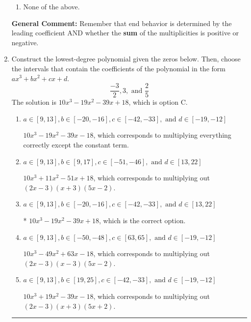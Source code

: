 \documentclass{extbook}[14pt]
\newcommand{\litem}[1]{\item #1

\rule{\textwidth}{0.4pt}}
\begin{document}
\begin{enumerate}
{\begin{enumerate}[label=\Alph*.]
\begin{multicols}{2}
\end{multicols}\item None of the above.\end{enumerate}
\textbf{General Comment:} Remember that end behavior is determined by the leading coefficient AND whether the \textbf{sum} of the multiplicities is positive or negative.
}
\litem{
Construct the lowest-degree polynomial given the zeros below. Then, choose the intervals that contain the coefficients of the polynomial in the form $ax^3+bx^2+cx+d$.
\[ \frac{-3}{2}, 3, \text{ and } \frac{2}{5} \]The solution is \( 10x^{3} -19 x^{2} -39 x + 18 \), which is option C.\begin{enumerate}[label=\Alph*.]
\item \( a \in [9, 13], b \in [-20, -16], c \in [-42, -33], \text{ and } d \in [-19, -12] \)

$10x^{3} -19 x^{2} -39 x -18$, which corresponds to multiplying everything correctly except the constant term.
\item \( a \in [9, 13], b \in [9, 17], c \in [-51, -46], \text{ and } d \in [13, 22] \)

$10x^{3} +11 x^{2} -51 x + 18$, which corresponds to multiplying out $(2x -3)(x + 3)(5x -2)$.
\item \( a \in [9, 13], b \in [-20, -16], c \in [-42, -33], \text{ and } d \in [13, 22] \)

* $10x^{3} -19 x^{2} -39 x + 18$, which is the correct option.
\item \( a \in [9, 13], b \in [-50, -48], c \in [63, 65], \text{ and } d \in [-19, -12] \)

$10x^{3} -49 x^{2} +63 x -18$, which corresponds to multiplying out $(2x -3)(x -3)(5x -2)$.
\item \( a \in [9, 13], b \in [19, 25], c \in [-42, -33], \text{ and } d \in [-19, -12] \)

$10x^{3} +19 x^{2} -39 x -18$, which corresponds to multiplying out $(2x -3)(x + 3)(5x + 2)$.
\end{enumerate}

}
\end{enumerate}
\end{document}
